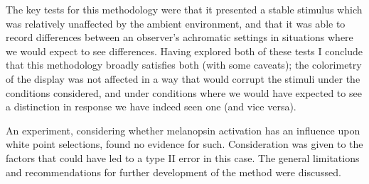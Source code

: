The key tests for this methodology were that it presented a stable stimulus which was relatively unaffected by the ambient environment, and that it was able to record differences between an observer's achromatic settings in situations where we would expect to see differences. Having explored both of these tests I conclude that this methodology broadly satisfies both (with some caveats); the colorimetry of the display was not affected in a way that would corrupt the stimuli under the conditions considered, and under conditions where we would have expected to see a distinction in response we have indeed seen one (and vice versa).

An experiment, considering whether melanopsin activation has an influence upon white point selections, found no evidence for such. Consideration was given to the factors that could have led to a type II error in this case.
The general limitations and recommendations for further development of the method were discussed.




